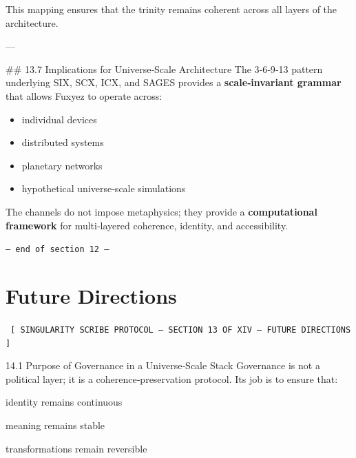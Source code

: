 \documentclass[12pt, a4paper]{book}
\begin{document}
This mapping ensures that the trinity remains coherent across all layers of the architecture.

---

\#\# 13.7 Implications for Universe‑Scale Architecture  
The 3‑6‑9‑13 pattern underlying SIX, SCX, ICX, and SAGES provides a \textbf{scale‑invariant grammar} that allows Fuxyez to operate across:

\begin{itemize}
  \item individual devices  
  \item distributed systems  
  \item planetary networks  
  \item hypothetical universe‑scale simulations  
\end{itemize}

The channels do not impose metaphysics; they provide a \textbf{computational framework} for multi‑layered coherence, identity, and accessibility.
    
    \vspace{1cm}
    \begin{center}
    \color{alienPurple}\texttt{--- end of section 12 ---}
    \end{center}
    \clearpage
    

    \chapter*{Future Directions}
    
    
    \begin{glyphbox}
    \centering
    \color{neonCyan}\fontsize{8}{10}\selectfont\texttt{
    [ SINGULARITY SCRIBE PROTOCOL -- SECTION 13 OF XIV -- FUTURE DIRECTIONS ]
    }
    \end{glyphbox}
    \vspace{0.3cm}
    
    
    14.1 Purpose of Governance in a Universe‑Scale Stack
Governance is not a political layer; it is a coherence‑preservation protocol.
Its job is to ensure that:

identity remains continuous

meaning remains stable

transformations remain reversible
\end{document}
